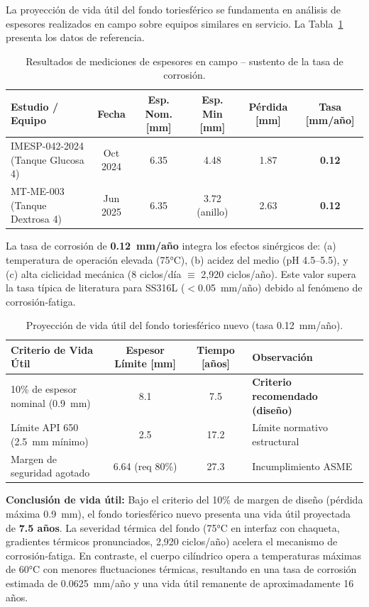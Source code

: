La proyección de vida útil del fondo toriesférico se fundamenta en análisis de espesores realizados en campo sobre equipos similares en servicio. La Tabla~\ref{tab:resumen_espesores_campo} presenta los datos de referencia.

\begin{table}[H]
\centering
\caption{Resultados de mediciones de espesores en campo -- sustento de la tasa de corrosión.}
\label{tab:resumen_espesores_campo}
\setcounter{itemcount}{0}
\begin{tabularx}{\textwidth}{@{}Xccccc@{}}
\toprule
\textbf{Estudio / Equipo} & \textbf{Fecha} & \textbf{Esp. Nom. [mm]} & \textbf{Esp. Min [mm]} & \textbf{Pérdida [mm]} & \textbf{Tasa [mm/año]} \\
\midrule
IMESP-042-2024 (Tanque Glucosa 4) & Oct 2024 & 6.35 & 4.48 & 1.87 & \textbf{0.12} \\
MT-ME-003 (Tanque Dextrosa 4) & Jun 2025 & 6.35 & 3.72 (anillo) & 2.63 & \textbf{0.12} \\
\bottomrule
\end{tabularx}
\end{table}

La tasa de corrosión de \textbf{0.12~mm/año} integra los efectos sinérgicos de: (a) temperatura de operación elevada (75°C), (b) acidez del medio (pH 4.5--5.5), y (c) alta ciclicidad mecánica (8 ciclos/día $\equiv$ 2,920 ciclos/año). Este valor supera la tasa típica de literatura para SS316L ($<$0.05~mm/año) debido al fenómeno de corrosión-fatiga.

\begin{table}[H]
\centering
\caption{Proyección de vida útil del fondo toriesférico nuevo (tasa 0.12~mm/año).}
\label{tab:resumen_vida_util}
\setcounter{itemcount}{0}
\begin{tabularx}{\textwidth}{@{}XccX@{}}
\toprule
\textbf{Criterio de Vida Útil} & \textbf{Espesor Límite [mm]} & \textbf{Tiempo [años]} & \textbf{Observación} \\
\midrule
10\% de espesor nominal (0.9~mm) & 8.1 & 7.5 & \textbf{Criterio recomendado (diseño)} \\
Límite API 650 (2.5~mm mínimo) & 2.5 & 17.2 & Límite normativo estructural \\
Margen de seguridad agotado & 6.64 (req 80\%) & 27.3 & Incumplimiento ASME \\
\bottomrule
\end{tabularx}
\end{table}

\textbf{Conclusión de vida útil:} Bajo el criterio del 10\% de margen de diseño (pérdida máxima 0.9~mm), el fondo toriesférico nuevo presenta una vida útil proyectada de \textbf{7.5 años}. La severidad térmica del fondo (75°C en interfaz con chaqueta, gradientes térmicos pronunciados, 2,920 ciclos/año) acelera el mecanismo de corrosión-fatiga. En contraste, el cuerpo cilíndrico opera a temperaturas máximas de 60°C con menores fluctuaciones térmicas, resultando en una tasa de corrosión estimada de 0.0625~mm/año y una vida útil remanente de aproximadamente 16 años.

